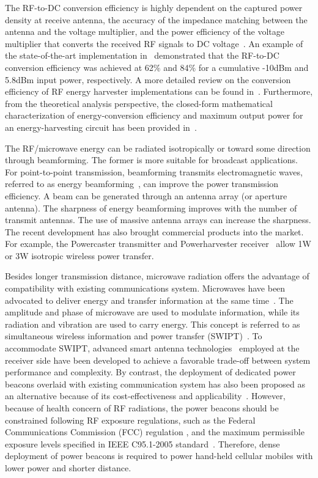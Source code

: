 \documentclass[twocolumn,10pt]{IEEEtran}
\begin{document}
The RF-to-DC conversion efficiency is highly dependent on the captured power density at receive antenna, the accuracy of the impedance matching between the antenna and the voltage multiplier, and the power efficiency of the voltage multiplier that converts the received RF signals to DC voltage~\cite{S.2013Ladan}.
An example of the state-of-the-art implementation in~\cite{V.2015Kuhn} demonstrated that the RF-to-DC conversion efficiency was achieved at 62$\%$ and 84$\%$ for a cumulative -10dBm and 5.8dBm input power, respectively. A more detailed review on the conversion efficiency of RF energy harvester implementations can be found in~\cite{X.LuSurvey,R.2014Valenta}.
Furthermore, from the theoretical analysis perspective, the closed-form mathematical characterization of energy-conversion efficiency and maximum output power for an energy-harvesting circuit has been provided in~\cite{R.2015Valenta}.


The RF/microwave energy can be radiated isotropically or toward some direction through beamforming. The former is more suitable for broadcast applications. For point-to-point transmission, beamforming transmits electromagnetic waves, referred to as energy beamforming~\cite{ZhangRuiMIMO}, can improve the power transmission efficiency. A beam can be generated through an antenna array (or aperture antenna). The sharpness of energy beamforming improves with the number of transmit antennas. The use of massive antenna arrays can increase the sharpness. The recent development has also brought commercial products into the market. For example, the Powercaster transmitter and Powerharvester receiver~\cite{Powercast} allow 1W or 3W isotropic wireless power transfer.

Besides longer transmission distance, microwave radiation offers the advantage of compatibility with existing communications system. Microwaves have been advocated to deliver energy and transfer information at the same time~\cite{Varshney2008}. The amplitude and phase of microwave are used to modulate information, while its radiation and vibration are used to carry energy. This concept is referred to as simultaneous wireless information and power transfer (SWIPT)~\cite{ZhangRuiMIMO}. To accommodate SWIPT, advanced smart antenna technologies~\cite{Z.Ding2015} employed at the receiver side have been developed to achieve a favorable trade-off between system performance and complexity.  By contrast, the deployment of dedicated power beacons overlaid with existing communication system has also been proposed as an alternative because of its cost-effectiveness and applicability~\cite{K1207.5640Huang}. However, because of health concern of RF radiations, the power beacons should be constrained following RF exposure regulations, such as the Federal Communications Commission (FCC) regulation \cite{FCC}, and the maximum permissible exposure levels specified in IEEE C95.1-2005 standard~\cite{MPE}. Therefore, dense deployment of power beacons is required to power hand-held cellular mobiles with lower power and shorter distance. 
\end{document}
